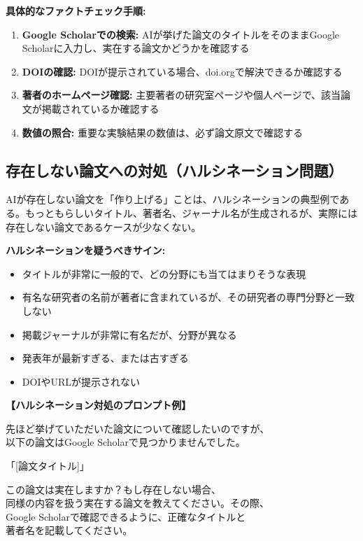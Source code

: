 \textbf{具体的なファクトチェック手順:}

\begin{enumerate}
\item \textbf{Google Scholarでの検索:} AIが挙げた論文のタイトルをそのままGoogle Scholarに入力し、実在する論文かどうかを確認する
\item \textbf{DOIの確認:} DOIが提示されている場合、doi.orgで解決できるか確認する
\item \textbf{著者のホームページ確認:} 主要著者の研究室ページや個人ページで、該当論文が掲載されているか確認する
\item \textbf{数値の照合:} 重要な実験結果の数値は、必ず論文原文で確認する
\end{enumerate}

\subsection{存在しない論文への対処（ハルシネーション問題）}

AIが存在しない論文を「作り上げる」ことは、ハルシネーションの典型例である。もっともらしいタイトル、著者名、ジャーナル名が生成されるが、実際には存在しない論文であるケースが少なくない。

\textbf{ハルシネーションを疑うべきサイン:}
\begin{itemize}
\item タイトルが非常に一般的で、どの分野にも当てはまりそうな表現
\item 有名な研究者の名前が著者に含まれているが、その研究者の専門分野と一致しない
\item 掲載ジャーナルが非常に有名だが、分野が異なる
\item 発表年が最新すぎる、または古すぎる
\item DOIやURLが提示されない
\end{itemize}

\begin{promptbox}
\textbf{【ハルシネーション対処のプロンプト例】}

先ほど挙げていただいた論文について確認したいのですが、\\
以下の論文はGoogle Scholarで見つかりませんでした。

「[論文タイトル]」

この論文は実在しますか？もし存在しない場合、\\
同様の内容を扱う実在する論文を教えてください。その際、\\
Google Scholarで確認できるように、正確なタイトルと\\
著者名を記載してください。
\end{promptbox}

